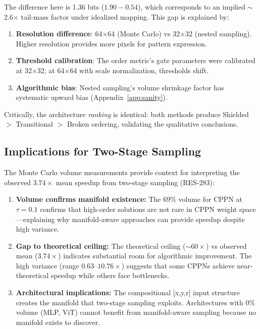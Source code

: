 The difference here is 1.36 bits ($1.90-0.54$), which corresponds to an implied $\sim$2.6$\times$ tail-mass factor under idealized mapping. This gap is explained by:
\begin{enumerate}
    \item \textbf{Resolution difference}: 64$\times$64 (Monte Carlo) vs 32$\times$32 (nested sampling). Higher resolution provides more pixels for pattern expression.
    \item \textbf{Threshold calibration}: The order metric's gate parameters were calibrated at 32$\times$32; at 64$\times$64 with scale normalization, thresholds shift.
    \item \textbf{Algorithmic bias}: Nested sampling's volume shrinkage factor has systematic upward bias (Appendix~\ref{app:sanity}).
\end{enumerate}

Critically, the architecture \emph{ranking} is identical: both methods produce Shielded $>$ Transitional $>$ Broken ordering, validating the qualitative conclusions.

\subsection{Implications for Two-Stage Sampling}

The Monte Carlo volume measurements provide context for interpreting the observed $3.74\times$ mean speedup from two-stage sampling (RES-283):

\begin{enumerate}
    \item \textbf{Volume confirms manifold existence:} The 69\% volume for CPPN at $\tau=0.1$ confirms that high-order solutions are not rare in CPPN weight space---explaining why manifold-aware approaches can provide speedup despite high variance.

    \item \textbf{Gap to theoretical ceiling:} The theoretical ceiling ($\sim 60\times$) vs observed mean ($3.74\times$) indicates substantial room for algorithmic improvement. The high variance (range $0.63$--$10.76\times$) suggests that some CPPNs achieve near-theoretical speedup while others face bottlenecks.

    \item \textbf{Architectural implications:} The compositional [x,y,r] input structure creates the manifold that two-stage sampling exploits. Architectures with 0\% volume (MLP, ViT) cannot benefit from manifold-aware sampling because no manifold exists to discover.
\end{enumerate}
